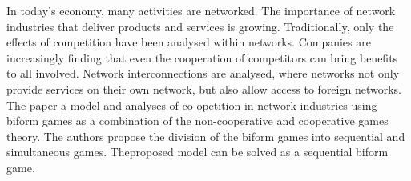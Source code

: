 
\begin{Abstrakt}
    In today's economy, many activities are networked. The importance of network industries that deliver products and services is growing. Traditionally, only the effects of competition have been analysed within networks. Companies are increasingly finding that even the cooperation of competitors can bring benefits to all involved. Network interconnections are analysed, where networks not only provide services on their own network, but also allow access to foreign networks. The paper a model and analyses of co-opetition in network industries using biform games as a combination of the non-cooperative and cooperative games theory. The authors propose the division of the biform games into sequential and simultaneous games. Theproposed model can be solved as a sequential biform game.
\end{Abstrakt}



\clearpage
